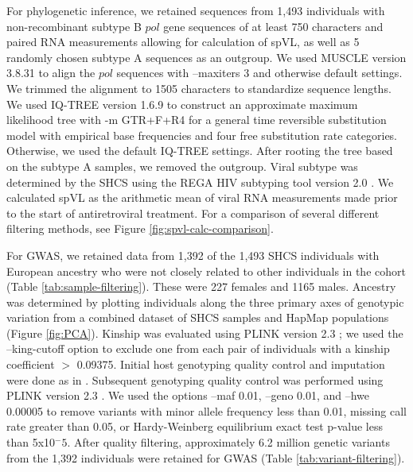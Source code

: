 \documentclass[11pt]{article}
\begin{document}
\begin{linenumbers}
For phylogenetic inference, we retained sequences from 1,493 individuals with non-recombinant subtype B $pol$ gene sequences of at least 750 characters and paired RNA measurements allowing for calculation of spVL, as well as 5 randomly chosen subtype A sequences as an outgroup. We used MUSCLE version 3.8.31 \citep{edgar_muscle:_2004} to align the $pol$ sequences with --maxiters 3 and otherwise default settings. We trimmed the alignment to 1505 characters to standardize sequence lengths. We used IQ-TREE version 1.6.9 \citep{Nguyen2014} to construct an approximate maximum likelihood tree with -m GTR+F+R4 for a general time reversible substitution model with empirical base frequencies and four free substitution rate categories. Otherwise, we used the default IQ-TREE settings. After rooting the tree based on the subtype A samples, we removed the outgroup. Viral subtype was determined by the SHCS using the REGA HIV subtyping tool version 2.0 \citep{DeOliveira2005}. We calculated spVL as the arithmetic mean of viral RNA measurements made prior to the start of antiretroviral treatment. For a comparison of several different filtering methods, see Figure \ref{fig:spvl-calc-comparison}. 

For GWAS, we retained data from 1,392 of the 1,493 SHCS individuals with European ancestry who were not closely related to other individuals in the cohort (Table \ref{tab:sample-filtering}). These were 227 females and 1165 males. Ancestry was determined by plotting individuals along the three primary axes of genotypic variation from a combined dataset of SHCS samples and HapMap populations (Figure \ref{fig:PCA}). Kinship was evaluated using PLINK version 2.3 \citep{Chang2015}; we used the --king-cutoff option to exclude one from each pair of individuals with a kinship coefficient $>$ 0.09375. Initial host genotyping quality control and imputation were done as in \cite{Thorball2021GeneticLymphoma}. Subsequent genotyping quality control was performed using PLINK version 2.3 \citep{Chang2015}. We used the options --maf 0.01, --geno 0.01, and --hwe 0.00005 to remove variants with minor allele frequency less than 0.01, missing call rate greater than 0.05, or Hardy-Weinberg equilibrium exact test p-value less than 5x10$^-5$. After quality filtering, approximately 6.2 million genetic variants from the 1,392 individuals were retained for GWAS (Table \ref{tab:variant-filtering}). 


\end{linenumbers}
\end{document}
